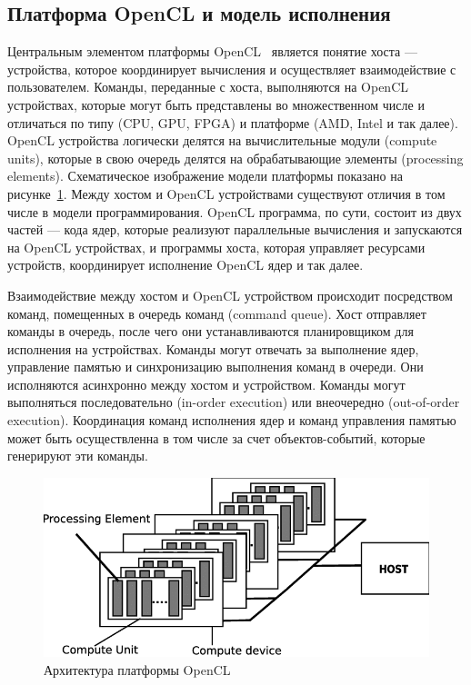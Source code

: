\subsection{Платформа OpenCL и модель исполнения}
Центральным элементом платформы OpenCL~\cite{ocl} является понятие хоста --- устройства, которое координирует вычисления и осуществляет взаимодействие с пользователем. Команды, переданные с хоста, выполняются на OpenCL устройствах, которые могут быть представлены во множественном числе и отличаться по типу (CPU, GPU, FPGA) и платформе (AMD, Intel и так далее). OpenCL устройства логически делятся на вычислительные модули (compute units), которые в свою очередь делятся на обрабатывающие элементы (processing elements). Схематическое изображение модели платформы показано на рисунке~\ref{fig:opencl_pl}.
Между хостом и OpenCL устройствами существуют отличия в том числе в модели программирования. OpenCL программа, по сути, состоит из двух частей --- кода ядер, которые реализуют параллельные вычисления и запускаются на OpenCL устройствах, и программы хоста, которая управляет ресурсами устройств, координирует исполнение OpenCL ядер и так далее.

Взаимодействие между хостом и OpenCL устройством происходит посредством команд, помещенных в очередь команд (command queue). Хост отправляет команды в очередь, после чего они устанавливаются планировщиком для исполнения на устройствах. Команды могут отвечать за выполнение ядер, управление памятью и синхронизацию выполнения команд в очереди. Они исполняются асинхронно между хостом и устройством. Команды могут выполняться последовательно (in-order execution) или внеочередно (out-of-order execution). Координация команд исполнения ядер и команд управления памятью может быть осуществленна в том числе за счет объектов-событий, которые генерируют эти команды.

\begin{figure}[h!]
\centering
\includegraphics[scale=0.4]{pictures/OpenCL-Host-Device-Architecture.png}
\caption{Архитектура платформы OpenCL~\cite{opencl_pl}}
\label{fig:opencl_pl}
\end{figure}

